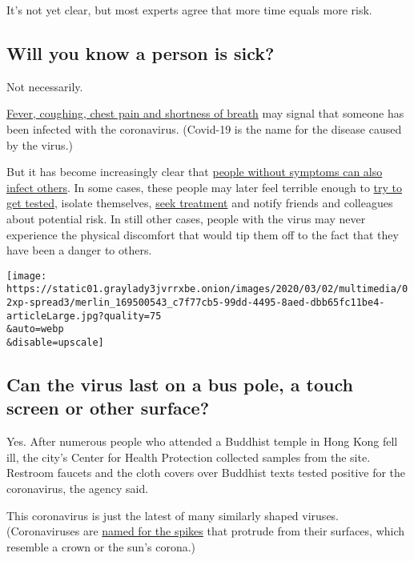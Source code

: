 It's not yet clear, but most experts agree that more time equals more
risk.

\hypertarget{will-you-know-a-person-is-sick}{%
\subsection{Will you know a person is
sick?}\label{will-you-know-a-person-is-sick}}

Not necessarily.

\href{https://www.nytimes3xbfgragh.onion/article/coronavirus-body-symptoms.html}{Fever,
coughing, chest pain and shortness of breath} may signal that someone
has been infected with the coronavirus. (Covid-19 is the name for the
disease caused by the virus.)

But it has become increasingly clear that
\href{https://www.nytimes3xbfgragh.onion/2020/02/26/health/coronavirus-asymptomatic.html}{people
without symptoms can also infect others}. In some cases, these people
may later feel terrible enough to
\href{https://www.nytimes3xbfgragh.onion/2020/03/18/nyregion/coronavirus-testing-positive.html}{try
to get tested}, isolate themselves,
\href{https://www.nytimes3xbfgragh.onion/2020/03/17/science/coronavirus-treatment.html}{seek
treatment} and notify friends and colleagues about potential risk. In
still other cases, people with the virus may never experience the
physical discomfort that would tip them off to the fact that they have
been a danger to others.

\texttt{[image: https://static01.graylady3jvrrxbe.onion/images/2020/03/02/multimedia/02xp-spread3/merlin\_169500543\_c7f77cb5-99dd-4495-8aed-dbb65fc11be4-articleLarge.jpg?quality=75\\\&auto=webp\\\&disable=upscale]}

\hypertarget{can-the-virus-last-on-a-bus-pole-a-touch-screen-or-other-surface}{%
\subsection{Can the virus last on a bus pole, a touch screen or other
surface?}\label{can-the-virus-last-on-a-bus-pole-a-touch-screen-or-other-surface}}

Yes. After numerous people who attended a Buddhist temple in Hong Kong
fell ill, the city's Center for Health Protection collected samples from
the site. Restroom faucets and the cloth covers over Buddhist texts
tested positive for the coronavirus, the agency said.

This coronavirus is just the latest of many similarly shaped viruses.
(Coronaviruses are
\href{https://www.nytimes3xbfgragh.onion/article/what-is-coronavirus.html}{named
for the spikes} that protrude from their surfaces, which resemble a
crown or the sun's corona.)

